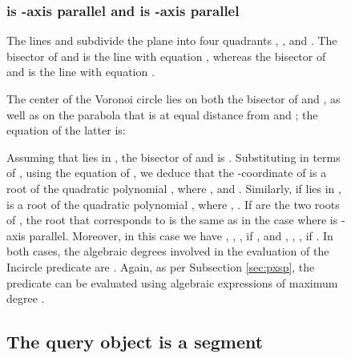 \documentclass[letterpaper,11pt]{article}
\newcommand{\incircle}{\textsf{Incircle}\xspace}
\newcommand{\vor}{Voronoi\xspace}
\begin{document}
{\begin{figure}[!b]
\begin{comment}
\begin{table}[ht]
\begin{center}
\begin{tabular}{|c|c|}
\hline
Relative positions of  and  & Root of  of interest\\
\hline \hline
&\\\hline
&\\\hline
\end{tabular}
\end{center}
\caption{Root of  that corresponds to  as a function of the
  relative positions of  and ;  is assumed to be -axis
  parallel.}
\label{Table:PSSP}
\end{table}
\end{comment}

\subsubsection{ is -axis parallel and  is -axis parallel}
\label{sec:pssp-vertical}

The lines  and  subdivide the plane into
four quadrants , ,  and .
The bisector of  and  is the line
 with equation , whereas the bisector of
 and  is the line  with equation .

The center  of the \vor circle  lies on both the
bisector of  and , as well as on the parabola
that is at equal distance from  and ; the equation of
the latter is:

Assuming that  lies in , the bisector of 
and  is . Substituting  in terms of ,
using the equation of , we deduce that the -coordinate
 of  is a root of the quadratic polynomial
, where
, and
.
Similarly, if  lies in ,  is a root of the
quadratic polynomial , where
,
.
If  are the two roots of , the root that
corresponds to  is the same as in the case where  is -axis
parallel.
Moreover, in this case we have ,
, , if , and
, , , if
. In both cases, the algebraic degrees
involved in the evaluation of the \incircle predicate are
. Again, as per Subsection \ref{sec:pxsp},
the  predicate can be evaluated using algebraic
expressions of maximum degree .







\subsection{The query object is a segment}\label{sec:psss}


\end{figure}}
\end{document}
